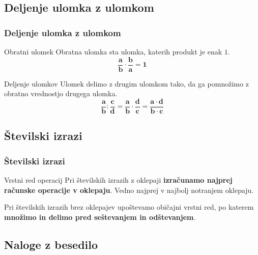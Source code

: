     \subsection{Deljenje ulomka z ulomkom}

        \begin{frame}[t]
            \frametitle{Deljenje ulomka z ulomkom}

            \begin{alertblock}{Obratni ulomek}
                Obratna ulomka sta ulomka, katerih produkt je enak $1$.
                $$ \mathbf{\frac{a}{b}\cdot\frac{b}{a}=1} $$
            \end{alertblock}

            \begin{alertblock}{Deljenje ulomkov}
                Ulomek delimo z drugim ulomkom tako, da ga pomnožimo z obratno vrednostjo drugega ulomka.
                $$ \mathbf{\frac{a}{b}:\frac{c}{d}=\frac{a}{b}\cdot\frac{d}{c}=\frac{a\cdot d}{b\cdot c}} $$
            \end{alertblock}       

        \end{frame}



    \subsection{Številski izrazi}

        \begin{frame}[t]
            \frametitle{Številski izrazi}

            \begin{alertblock}{Vrstni red operacij}
                Pri številskih izrazih z  oklepaji \textbf{izračunamo najprej računske operacije v oklepaju}. Vedno najprej v najbolj notranjem oklepaju.

                Pri številskih izrazih brez oklepajev upoštevamo običajni vrstni red, po katerem \textbf{množimo in delimo pred seštevanjem in odštevanjem}.
            \end{alertblock}
        \end{frame}

    \subsection{Naloge z besedilo}

